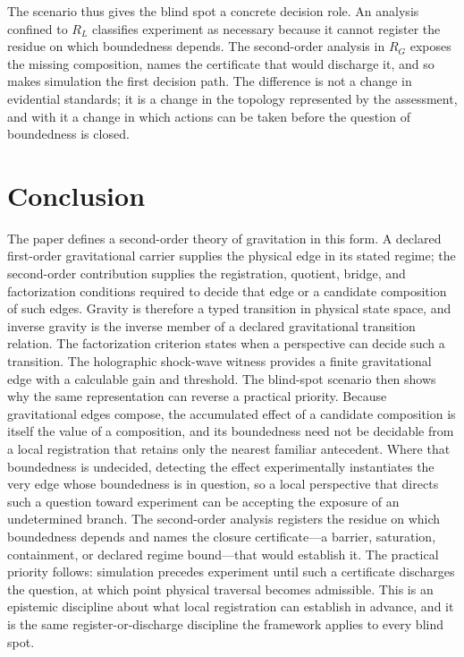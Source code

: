 \documentclass[10pt,twoside,a5paper]{article}
\theoremstyle{definition}
\begin{document}
The scenario thus gives the blind spot a concrete decision role. An analysis confined
to $R_L$ classifies experiment as necessary because it cannot register the residue on
which boundedness depends. The second-order analysis in $R_G$ exposes the missing
composition, names the certificate that would discharge it, and so makes simulation
the first decision path. The difference is not a change in evidential standards; it is
a change in the topology represented by the assessment, and with it a change in which
actions can be taken before the question of boundedness is closed.

\section{Conclusion}
\label{sec:conclusion}
The paper defines a second-order theory of gravitation in this form. A declared
first-order gravitational carrier supplies the physical edge in its stated regime;
the second-order contribution supplies the registration, quotient, bridge, and
factorization conditions required to decide that edge or a candidate composition of
such edges. Gravity is therefore a typed transition in physical state space, and
inverse gravity is the inverse member of a declared gravitational transition
relation. The factorization criterion states when a perspective can decide such a
transition. The holographic shock-wave witness provides a finite gravitational edge
with a calculable gain and threshold. The blind-spot scenario then shows why the
same representation can reverse a practical priority. Because gravitational edges
compose, the accumulated effect of a candidate composition is itself the value of a
composition, and its boundedness need not be decidable from a local registration
that retains only the nearest familiar antecedent. Where that boundedness is
undecided, detecting the effect experimentally instantiates the very edge whose
boundedness is in question, so a local perspective that directs such a question
toward experiment can be accepting the exposure of an undetermined branch. The
second-order analysis registers the residue on which boundedness depends and names
the closure certificate---a barrier, saturation, containment, or declared regime
bound---that would establish it. The practical priority follows: simulation precedes
experiment until such a certificate discharges the question, at which point physical
traversal becomes admissible. This is an epistemic discipline about what local
registration can establish in advance, and it is the same register-or-discharge
discipline the framework applies to every blind spot.
\end{document}
